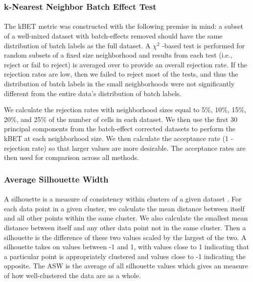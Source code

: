 \documentclass[
12pt, %
letterpaper, %
oneside, %
headinclude,footinclude, %
BCOR5mm, %
]{scrartcl}
\begin{document}
\subsubsection*{k-Nearest Neighbor Batch Effect Test}

\paragraph*{}
The kBET metric \citep{buttner2019test} was constructed with the following premise in mind: a subset of a well-mixed dataset with batch-effects removed should have the same distribution of batch labels as the full dataset. A $\chi^2$ -based test is performed for random subsets of a fixed size neighborhood and results from each test (i.e., reject or fail to reject) is averaged over to provide an overall rejection rate. If the rejection rates are low, then we failed to reject most of the tests, and thus the distribution of batch labels in the small neighborhoods were not significantly different from the entire data's distribution of batch labels.

We calculate the rejection rates with neighborhood sizes equal to 5\%, 10\%, 15\%, 20\%, and 25\% of the number of cells in each dataset. We then use the first 30 principal components from the batch-effect corrected datasets to perform the kBET at each neighborhood size. We then calculate the acceptance rate (1 - rejection rate) so that larger values are more desirable. The acceptance rates are then used for comparison across all methods.

\subsubsection*{Average Silhouette Width}

\paragraph*{}
A silhouette is a measure of consistency within clusters of a given dataset \citep{rousseeuw1987silhouettes}. For each data point in a given cluster, we calculate the mean distance between itself and all other points within the same cluster. We also calculate the smallest mean distance between itself and any other data point not in the same cluster. Then a silhouette is the difference of these two values scaled by the largest of the two. A silhouette takes on values between -1 and 1, with values close to 1 indicating that a particular point is appropriately clustered and values close to -1 indicating the opposite. The ASW is the average of all silhouette values which gives an measure of how well-clustered the data are as a whole.
\end{document}
